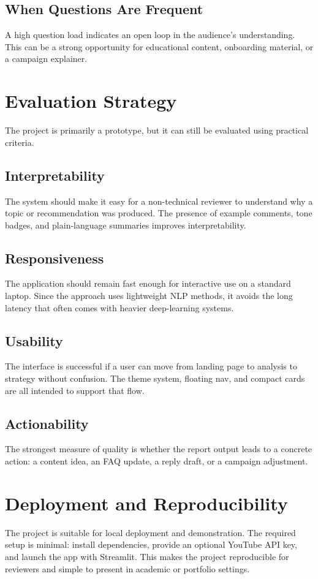 \subsection{When Questions Are Frequent}
A high question load indicates an open loop in the audience's understanding. This can be a strong opportunity for educational content, onboarding material, or a campaign explainer.

\section{Evaluation Strategy}
The project is primarily a prototype, but it can still be evaluated using practical criteria.

\subsection{Interpretability}
The system should make it easy for a non-technical reviewer to understand why a topic or recommendation was produced. The presence of example comments, tone badges, and plain-language summaries improves interpretability.

\subsection{Responsiveness}
The application should remain fast enough for interactive use on a standard laptop. Since the approach uses lightweight NLP methods, it avoids the long latency that often comes with heavier deep-learning systems.

\subsection{Usability}
The interface is successful if a user can move from landing page to analysis to strategy without confusion. The theme system, floating nav, and compact cards are all intended to support that flow.

\subsection{Actionability}
The strongest measure of quality is whether the report output leads to a concrete action: a content idea, an FAQ update, a reply draft, or a campaign adjustment.

\section{Deployment and Reproducibility}
The project is suitable for local deployment and demonstration. The required setup is minimal: install dependencies, provide an optional YouTube API key, and launch the app with Streamlit. This makes the project reproducible for reviewers and simple to present in academic or portfolio settings.

